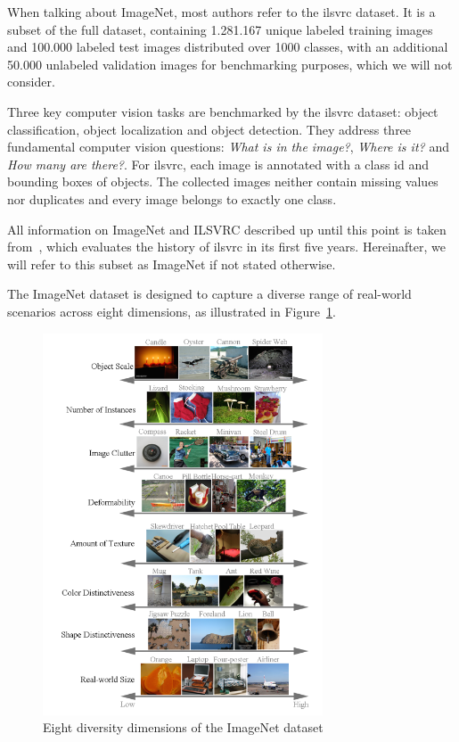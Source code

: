When talking about ImageNet, most authors refer to the \ac{ilsvrc} dataset.
It is a subset of the full dataset, containing 1.281.167 unique labeled training images and 100.000 labeled test
images distributed over 1000 classes, with an additional 50.000 unlabeled validation images for benchmarking
purposes, which we will not consider.

Three key computer vision tasks are benchmarked by the \ac{ilsvrc} dataset: object classification, object
localization and object detection.
They address three fundamental computer vision questions: \textit{What is in the image?}, \textit{Where is it?} and
\textit{How many are there?}.
For \ac{ilsvrc}, each image is annotated with a class id and bounding boxes of objects.
The collected images neither contain missing values nor duplicates and every image belongs to exactly one class.

All information on ImageNet and ILSVRC described up until this point is taken from~\cite{imagenet_breakdown}, which
evaluates the history of \ac{ilsvrc} in its first five years.
Hereinafter, we will refer to this subset as ImageNet if not stated otherwise.

The ImageNet dataset is designed to capture a diverse range of real-world scenarios across eight dimensions, as
illustrated in Figure~\ref{fig:imnet_dimensions}.

\begin{figure}[h]
    \centering
    \includegraphics[width=0.74\textwidth]{../../sample_images/imnet_dimension}
    \caption{Eight diversity dimensions of the ImageNet dataset~\cite{imagenet_breakdown}}
    \label{fig:imnet_dimensions}
\end{figure}

